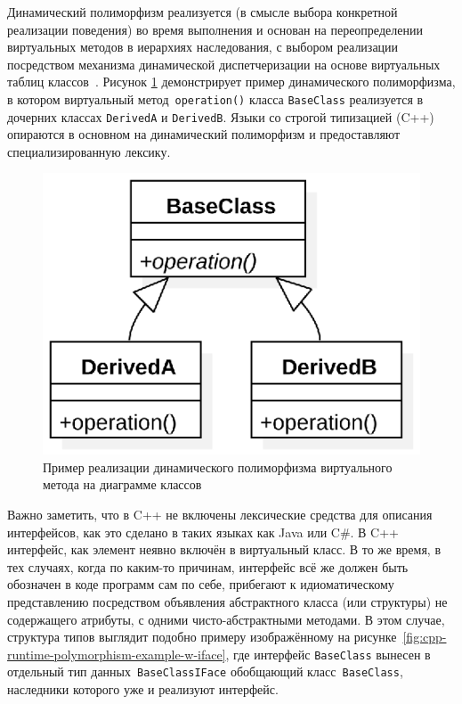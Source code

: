 Динамический полиморфизм
реализуется (в смысле выбора конкретной реализации поведения) во время
выполнения и основан на переопределении виртуальных
методов в иерархиях наследования, с выбором реализации
посредством механизма динамической
диспетчеризации на основе виртуальных таблиц
классов~\cite{Meyer1997, gof1994design-patterns}.
Рисунок \ref{fig:cpp-runtime-polymorphism-example} демонстрирует
пример динамического полиморфизма, в котором виртуальный
метод~\texttt{operation()} класса \texttt{BaseClass} реализуется
в дочерних классах \texttt{DerivedA} и \texttt{DerivedB}.
Языки со строгой типизацией (C++) опираются в основном на динамический
полиморфизм и предоставляют специализированную лексику.

\begin{figure}
    \centering
    \includegraphics[width=0.35\linewidth]{images/illustrative/runtime polymorphism.eps}
    \caption{Пример реализации динамического полиморфизма виртуального метода на диаграмме классов}
    \label{fig:cpp-runtime-polymorphism-example}
\end{figure}

Важно заметить, что в C++ не включены лексические средства для
описания интерфейсов, как это сделано в таких языках как Java
или C\#. В C++ интерфейс, как элемент неявно включён в виртуальный
класс. В то же время, в тех случаях, когда по каким-то причинам,
интерфейс всё же должен быть обозначен в коде программ сам по себе,
прибегают к идиоматическому представлению посредством объявления абстрактного класса
(или структуры) не содержащего атрибуты, с одними чисто-абстрактными
методами. В этом случае, структура типов выглядит подобно примеру
изображённому на рисунке~\ref{fig:cpp-runtime-polymorphism-example-w-iface},
где интерфейс \texttt{BaseClass} вынесен в отдельный тип
данных~\texttt{BaseClassIFace} обобщающий класс~\texttt{BaseClass},
наследники которого уже и реализуют интерфейс.

